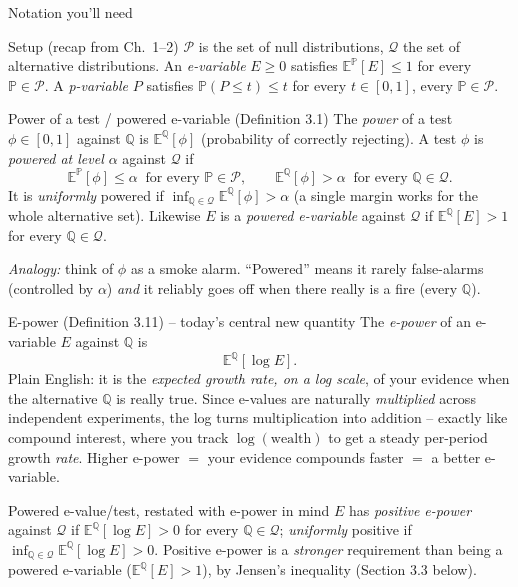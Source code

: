 \documentclass[aspectratio=169,10pt]{beamer}
\newcommand{\PP}{\mathbb{P}}
\newcommand{\QQ}{\mathbb{Q}}
\newcommand{\EE}{\mathbb{E}}
\newcommand{\calP}{\mathcal{P}}
\newcommand{\calQ}{\mathcal{Q}}
\begin{document}
\begin{frame}[allowframebreaks]{Notation you'll need}
  \begin{block}{Setup (recap from Ch.\ 1--2)}
    $\calP$ is the set of null distributions, $\calQ$ the set of alternative distributions. An \emph{e-variable} $E\ge 0$ satisfies $\EE^\PP[E]\le 1$ for every $\PP\in\calP$. A \emph{p-variable} $P$ satisfies $\PP(P\le t)\le t$ for every $t\in[0,1]$, every $\PP\in\calP$.
  \end{block}

  \begin{block}{Power of a test / powered e-variable (Definition 3.1)}
    The \emph{power} of a test $\phi\in[0,1]$ against $\QQ$ is $\EE^\QQ[\phi]$ (probability of correctly rejecting). A test $\phi$ is \emph{powered at level $\alpha$} against $\calQ$ if
    \[
      \EE^\PP[\phi]\le\alpha \ \text{ for every } \PP\in\calP, \qquad \EE^\QQ[\phi]>\alpha \ \text{ for every } \QQ\in\calQ.
    \]
    It is \emph{uniformly} powered if $\inf_{\QQ\in\calQ}\EE^\QQ[\phi]>\alpha$ (a single margin works for the whole alternative set). Likewise $E$ is a \emph{powered e-variable} against $\calQ$ if $\EE^\QQ[E]>1$ for every $\QQ\in\calQ$.

    \emph{Analogy:} think of $\phi$ as a smoke alarm. ``Powered'' means it rarely false-alarms (controlled by $\alpha$) \emph{and} it reliably goes off when there really is a fire (every $\QQ$).
  \end{block}

  \begin{block}{E-power (Definition 3.11) -- today's central new quantity}
    The \emph{e-power} of an e-variable $E$ against $\QQ$ is
    \[
      \EE^\QQ[\log E].
    \]
    Plain English: it is the \emph{expected growth rate, on a log scale}, of your evidence when the alternative $\QQ$ is really true. Since e-values are naturally \emph{multiplied} across independent experiments, the log turns multiplication into addition -- exactly like compound interest, where you track $\log(\text{wealth})$ to get a steady per-period growth \emph{rate}. Higher e-power $=$ your evidence compounds faster $=$ a better e-variable.
  \end{block}

  \begin{block}{Powered e-value/test, restated with e-power in mind}
    $E$ has \emph{positive e-power} against $\calQ$ if $\EE^\QQ[\log E]>0$ for every $\QQ\in\calQ$; \emph{uniformly} positive if $\inf_{\QQ\in\calQ}\EE^\QQ[\log E]>0$. Positive e-power is a \emph{stronger} requirement than being a powered e-variable ($\EE^\QQ[E]>1$), by Jensen's inequality (Section 3.3 below).
  \end{block}


\end{frame}
\end{document}
